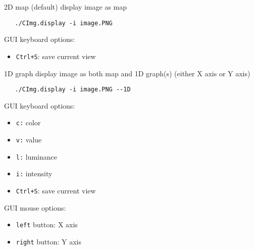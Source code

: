 \begin{Desc}
\item[2D map (default)]display image as map 

\begin{Code}\begin{verbatim}   ./CImg.display -i image.PNG
\end{verbatim}
\end{Code}

 GUI keyboard options: \begin{itemize}
\item {\tt Ctrl+S}: save current view \end{itemize}
\end{Desc}
\begin{Desc}
\item[1D graph]display image as both map and 1D graph(s) (either X axis or Y axis) 

\begin{Code}\begin{verbatim}   ./CImg.display -i image.PNG --1D
\end{verbatim}
\end{Code}

 GUI keyboard options: \begin{itemize}
\item {\tt c:} color \item {\tt v:} value \item {\tt l:} luminance \item {\tt i:} intensity \item {\tt Ctrl+S}: save current view\end{itemize}
GUI mouse options: \begin{itemize}
\item {\tt left} button: X axis \item {\tt right} button: Y axis \end{itemize}
\end{Desc}
